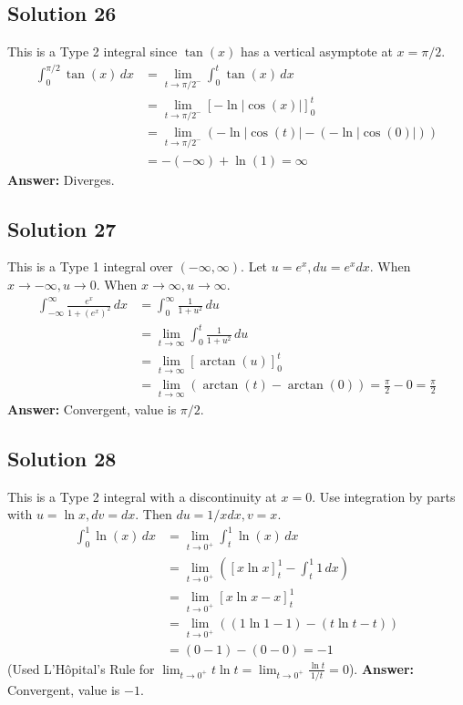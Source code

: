 \documentclass{article}
\begin{document}
\subsection*{Solution 26}
This is a Type 2 integral since $\tan(x)$ has a vertical asymptote at $x=\pi/2$.
\begin{align*}
\int_{0}^{\pi/2} \tan(x) \,dx &= \lim_{t \to \pi/2^-} \int_{0}^{t} \tan(x) \,dx \\
&= \lim_{t \to \pi/2^-} [-\ln|\cos(x)|]_{0}^{t} \\
&= \lim_{t \to \pi/2^-} (-\ln|\cos(t)| - (-\ln|\cos(0)|)) \\
&= -(-\infty) + \ln(1) = \infty
\end{align*}
\textbf{Answer:} Diverges.

\subsection*{Solution 27}
This is a Type 1 integral over $(-\infty, \infty)$. Let $u=e^x, du=e^x dx$. When $x \to -\infty, u \to 0$. When $x \to \infty, u \to \infty$.
\begin{align*}
\int_{-\infty}^{\infty} \frac{e^x}{1+(e^x)^2} \,dx &= \int_{0}^{\infty} \frac{1}{1+u^2} \,du \\
&= \lim_{t \to \infty} \int_{0}^{t} \frac{1}{1+u^2} \,du \\
&= \lim_{t \to \infty} [\arctan(u)]_{0}^{t} \\
&= \lim_{t \to \infty} (\arctan(t) - \arctan(0)) = \frac{\pi}{2} - 0 = \frac{\pi}{2}
\end{align*}
\textbf{Answer:} Convergent, value is $\pi/2$.

\subsection*{Solution 28}
This is a Type 2 integral with a discontinuity at $x=0$. Use integration by parts with $u=\ln x, dv=dx$. Then $du=1/x dx, v=x$.
\begin{align*}
\int_{0}^{1} \ln(x) \,dx &= \lim_{t \to 0^+} \int_{t}^{1} \ln(x) \,dx \\
&= \lim_{t \to 0^+} \left( [x\ln x]_{t}^{1} - \int_{t}^{1} 1 \,dx \right) \\
&= \lim_{t \to 0^+} [x\ln x - x]_{t}^{1} \\
&= \lim_{t \to 0^+} ((1\ln 1 - 1) - (t\ln t - t)) \\
&= (0 - 1) - (0 - 0) = -1
\end{align*}
(Used L'Hôpital's Rule for $\lim_{t \to 0^+} t \ln t = \lim_{t \to 0^+} \frac{\ln t}{1/t} = 0$).
\textbf{Answer:} Convergent, value is $-1$.
\end{document}
